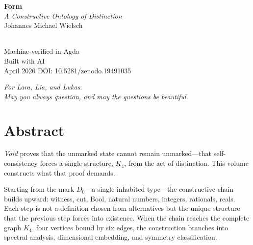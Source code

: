 \documentclass[11pt,a4paper]{book}
\begin{document}
\begin{titlepage}
\centering
\vspace*{3cm}
{\Huge\bfseries Form}\\[0.5cm]
{\Large\itshape A Constructive Ontology of Distinction}\\[2cm]
{\large Johannes Michael Wielsch}\\[4cm]
\\[4cm]
{\small Machine-verified in Agda}\\
{\small Built with AI}\\
\vfill
{\small April 2026}
{\small DOI: 10.5281/zenodo.19491035}\\[0.5cm]
\end{titlepage}

\thispagestyle{empty}
\vspace*{\fill}
\begin{center}
\textit{For Lara, Lia, and Lukas.}\\[0.6em]
\textit{May you always question, and may the questions be beautiful.}
\end{center}
\vspace*{\fill}

\clearpage

\frontmatter
\chapter*{Abstract}

\textit{Void} proves that the unmarked state cannot remain unmarked—that self-consistency forces a single structure, $K_4$, from the act of distinction. This volume constructs what that proof demands.

Starting from the mark $D_0$—a single inhabited type—the constructive chain builds upward: witness, cut, Bool, natural numbers, integers, rationals, reals. Each step is not a definition chosen from alternatives but the unique structure that the previous step forces into existence. When the chain reaches the complete graph $K_4$, four vertices bound by six edges, the construction branches into spectral analysis, dimensional embedding, and symmetry classification.
\end{document}
